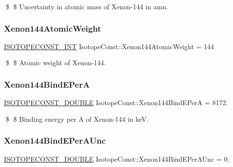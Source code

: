 \$ \$ Uncertainty in atomic mass of Xenon-\/144 in amu. \mbox{\label{group___isotope_const-_xenon-_xe144_ga891e85c32a94b612c25a84b58447761b}} 
\subsubsection{\texorpdfstring{Xenon144\+Atomic\+Weight}{Xenon144AtomicWeight}}
{\footnotesize\ttfamily \mbox{\hyperlink{group___isotope_const-_macros_ga5f18360b3e99483a35c32d789e62621c}{I\+S\+O\+T\+O\+P\+E\+C\+O\+N\+S\+T\+\_\+\+I\+NT}} Isotope\+Const\+::\+Xenon144\+Atomic\+Weight = 144}

\$ \$ Atomic weight of Xenon-\/144. \mbox{\label{group___isotope_const-_xenon-_xe144_ga28ff6f9c655135c6490641d4bf4db057}} 
\subsubsection{\texorpdfstring{Xenon144\+Bind\+E\+PerA}{Xenon144BindEPerA}}
{\footnotesize\ttfamily \mbox{\hyperlink{group___isotope_const-_macros_ga8f45a7272ce02c0b4c65c44636ed719a}{I\+S\+O\+T\+O\+P\+E\+C\+O\+N\+S\+T\+\_\+\+D\+O\+U\+B\+LE}} Isotope\+Const\+::\+Xenon144\+Bind\+E\+PerA = 8172.}

\$ \$ Binding energy per A of Xenon-\/144 in keV. \mbox{\label{group___isotope_const-_xenon-_xe144_gae2419a7418bac4545229550500ef8965}} 
\subsubsection{\texorpdfstring{Xenon144\+Bind\+E\+Per\+A\+Unc}{Xenon144BindEPerAUnc}}
{\footnotesize\ttfamily \mbox{\hyperlink{group___isotope_const-_macros_ga8f45a7272ce02c0b4c65c44636ed719a}{I\+S\+O\+T\+O\+P\+E\+C\+O\+N\+S\+T\+\_\+\+D\+O\+U\+B\+LE}} Isotope\+Const\+::\+Xenon144\+Bind\+E\+Per\+A\+Unc = 0.}

